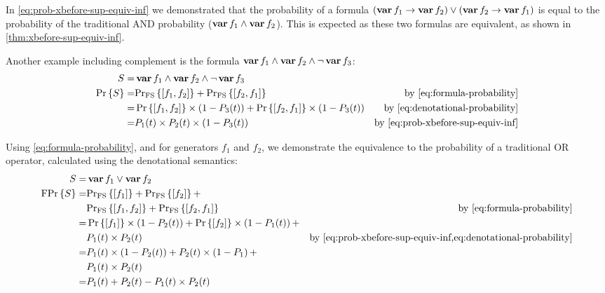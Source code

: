 In \cref{eq:prob-xbefore-sup-equiv-inf} we demonstrated that the probability of a formula $\left(\operatorname{\mathbf{var}} f_1 \rightarrow \operatorname{\mathbf{var}} f_2\right) \lor \left(\operatorname{\mathbf{var}} f_2 \rightarrow \operatorname{\mathbf{var}} f_1\right)$ is equal to the probability of the traditional \ac{AND} probability ($\operatorname{\mathbf{var}} f_1 \land \operatorname{\mathbf{var}} f_2$).
This is expected as these two formulas are equivalent, as shown in \cref{thm:xbefore-sup-equiv-inf}.

Another example including complement is the formula $\operatorname{\mathbf{var}} f_1 \land \operatorname{\mathbf{var}} f_2 \land \lnot \operatorname{\mathbf{var}} f_3$:
%
\begin{align}
S = & \var{f_1} \land \var{f_2} \land \lnot \var{f_3}\nonumber\\
\probability{S} = &
\denotationalprob{\left[f_1,f_2\right]} + \denotationalprob{\left[f_2,f_1\right]} 
  & \text{by \cref{eq:formula-probability}}\nonumber\\
= & \probability{\left[f_1,f_2\right]}\times \left(1 - P_3(t)\right)
+ \probability{\left[f_2,f_1\right]}\times \left(1 - P_3(t)\right)
	& \text{by \cref{eq:denotational-probability}}\nonumber\\
= & P_1(t) \times P_2(t) \times \left(1 - P_3(t)\right) & \text{by \cref{eq:prob-xbefore-sup-equiv-inf}}
\end{align}

Using \cref{eq:formula-probability}, and for generators $f_1$ and $f_2$, we demonstrate the equivalence to the probability of a traditional \ac{OR} operator, calculated using the denotational semantics:
%
\begin{align}
S = & \vari{1} \lor \vari{2}\nonumber\\
\formulaprob{S} = & \denotationalprob{\left[f_1\right]} +
  \denotationalprob{\left[f_2\right]} + \nonumber\\
  & \denotationalprob{\left[f_1,f_2\right]} +
  \denotationalprob{\left[f_2,f_1\right]}
  & \text{by \cref{eq:formula-probability}}
\nonumber\\
= &\probability{\left[f_1\right]}\times\left(1 - P_2(t)\right) + 
\probability{\left[f_2\right]}\times\left(1 - P_1(t)\right) +\nonumber\\
&P_1(t) \times P_2(t) & \text{by \cref{eq:prob-xbefore-sup-equiv-inf,eq:denotational-probability}}\nonumber\\
= & P_1(t) \times \left(1 - P_2(t)\right) + P_2(t) \times \left(1 - P_1\right) + \nonumber\\
  & P_1(t) \times P_2(t)\nonumber\\
= & P_1(t) + P_2(t) - P_1(t) \times P_2(t)
\end{align}

